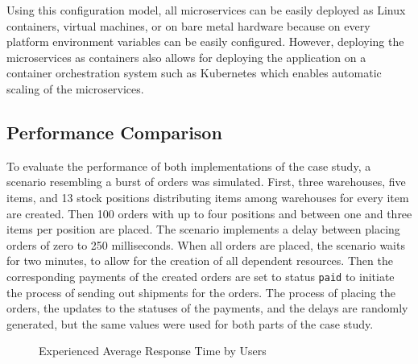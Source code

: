 Using this configuration model, all microservices can be easily deployed as Linux containers, virtual machines, or on bare metal hardware because on every platform environment variables can be easily configured.
However, deploying the microservices as containers also allows for deploying the application on a container orchestration system such as Kubernetes which enables automatic scaling of the microservices.

\subsection{Performance Comparison}\label{sec:cs-perf}

To evaluate the performance of both implementations of the case study, a scenario resembling a burst of orders was simulated.
First, three warehouses, five items, and 13 stock positions distributing items among warehouses for every item are created.
Then 100 orders with up to four positions and between one and three items per position are placed.
The scenario implements a delay between placing orders of zero to 250 milliseconds.
When all orders are placed, the scenario waits for two minutes, to allow for the creation of all dependent resources.
Then the corresponding payments of the created orders are set to status \texttt{paid} to initiate the process of sending out shipments for the orders.
The process of placing the orders, the updates to the statuses of the payments, and the delays are randomly generated, but the same values were used for both parts of the case study.

\begin{figure}[b!]
    \centering
    \caption{Experienced Average Response Time by Users}\label{fig:exp-resp-time}    
\end{figure}

